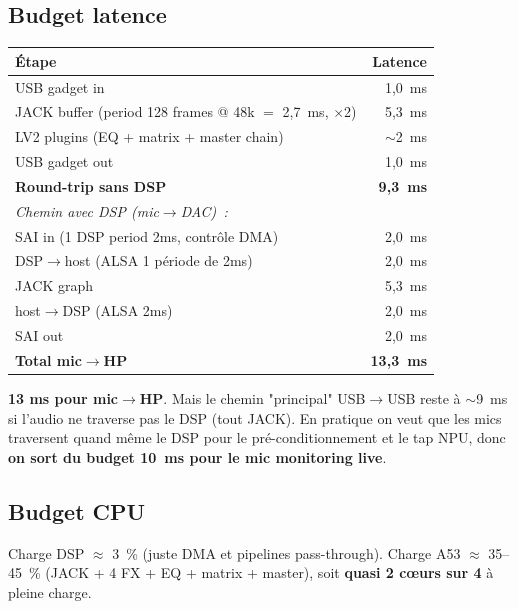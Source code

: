 \documentclass[11pt,a4paper]{article}
\begin{document}
\subsection{Budget latence}
\begin{center}
\begin{tabular}{lr}
\toprule
\textbf{Étape} & \textbf{Latence} \\
\midrule
USB gadget in & 1{,}0~ms \\
JACK buffer (period 128 frames @ 48k $=$ 2{,}7~ms, $\times$2) & 5{,}3~ms \\
LV2 plugins (EQ + matrix + master chain) & $\sim$2~ms \\
USB gadget out & 1{,}0~ms \\
\midrule
\textbf{Round-trip sans DSP} & \textbf{9{,}3~ms} \\
\midrule
\textit{Chemin avec DSP (mic$\rightarrow$DAC)~:} & \\
SAI in (1 DSP period 2ms, contrôle DMA) & 2{,}0~ms \\
DSP$\rightarrow$host (ALSA 1 période de 2ms) & 2{,}0~ms \\
JACK graph & 5{,}3~ms \\
host$\rightarrow$DSP (ALSA 2ms) & 2{,}0~ms \\
SAI out & 2{,}0~ms \\
\textbf{Total mic$\rightarrow$HP} & \textbf{13{,}3~ms} \\
\bottomrule
\end{tabular}
\end{center}
\textcolor{red!70!black}{\textbf{13 ms pour mic$\rightarrow$HP}}. Mais le chemin "principal" USB$\rightarrow$USB reste à $\sim$9~ms si l'audio ne traverse pas le DSP (tout JACK). En pratique on veut que les mics traversent quand même le DSP pour le pré-conditionnement et le tap NPU, donc \textbf{on sort du budget 10~ms pour le mic monitoring live}.

\subsection{Budget CPU}
Charge DSP $\approx$ 3~\% (juste DMA et pipelines pass-through).
Charge A53 $\approx$ 35--45~\% (JACK + 4 FX + EQ + matrix + master), soit \textbf{quasi 2 cœurs sur 4} à pleine charge.
\end{document}
